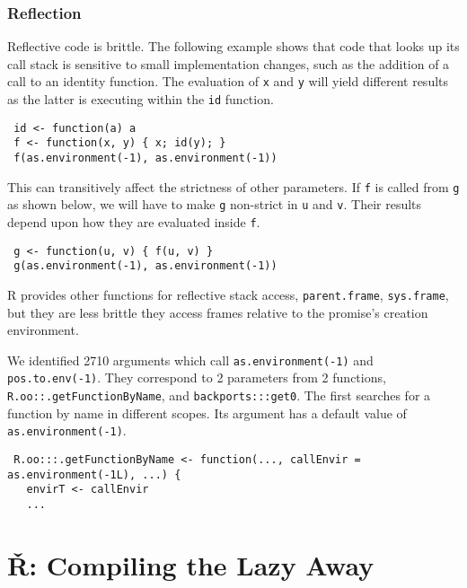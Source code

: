 \documentclass[review,nonacm,screen,acmsmall,anonymous=true]{acmart}
\newcommand{\code}[1]{\lstinline |#1|\xspace}
\renewcommand{\c}[1]{\lstinline |#1|\xspace}
\renewcommand{\Rsh}{{\sf\v R}\xspace}
\begin{document}
\subsubsection{Reflection}
Reflective code is brittle. The following example shows that code that looks up
its call stack is sensitive to small implementation changes, such as the
addition of a call to an identity function. The evaluation of \c x and \c y will
yield different results as the latter is executing within the \c{id} function.
%
\begin{lstlisting}
 id <- function(a) a
 f <- function(x, y) { x; id(y); }
 f(as.environment(-1), as.environment(-1))
\end{lstlisting}
%
\noindent
This can transitively affect the strictness of other parameters. If \code{f} is
called from \code{g} as shown below, we will have to make \code{g} non-strict in
\code{u} and \code{v}. Their results depend upon how they are evaluated inside
\code{f}.

\begin{lstlisting}
 g <- function(u, v) { f(u, v) }
 g(as.environment(-1), as.environment(-1))
\end{lstlisting}
%
\noindent
R provides other functions for reflective stack access, \code{parent.frame},
\code{sys.frame}, but they are less brittle they access frames relative to the
promise's creation environment.

We identified 2710 arguments which call \code{as.environment(-1)} and
\code{pos.to.env(-1)}. They correspond to 2 parameters from 2 functions,
\code{R.oo::.getFunctionByName}, and \code{backports:::get0}.
%
The first searches for a function by name in different scopes. Its argument has
a default value of \code{as.environment(-1)}.
%
\begin{lstlisting}
 R.oo:::.getFunctionByName <- function(..., callEnvir = as.environment(-1L), ...) {
   envirT <- callEnvir
   ...
\end{lstlisting}
%

\section{\Rsh: Compiling the Lazy Away}\label{sec:rsh}
\end{document}
